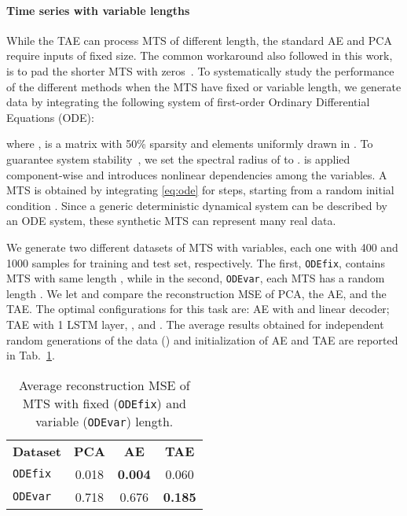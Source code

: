 \documentclass[a4paper,10pt,pdftex]{article}
\begin{document}
\paragraph{\textbf{Time series with variable lengths}}

While the TAE can process MTS of different length, the standard AE and PCA require inputs of fixed size. 
The common workaround also followed in this work, is to pad the shorter MTS with zeros~\cite{mann2008smoothing}.
To systematically study the performance of the different methods when the MTS have fixed or variable length, we generate data by integrating the following system of first-order Ordinary Differential Equations (ODE):

where ,  is a matrix with 50\% sparsity and elements uniformly drawn in .
To guarantee system stability~\cite{bianchi2017multiplex}, we set the spectral radius of  to .
 is applied component-wise and introduces nonlinear dependencies among the variables.
A MTS  is obtained by integrating \eqref{eq:ode} for  steps, starting from a random initial condition .
Since a generic deterministic dynamical system can be described by an ODE system, these synthetic MTS can represent many real data.

We generate two different datasets of MTS with  variables, each one with 400 and 1000 samples for training and test set, respectively.
The first, \texttt{ODEfix}, contains MTS with same length , while in the second, \texttt{ODEvar}, each MTS has a random length .
We let  and compare the reconstruction MSE of PCA, the AE, and the TAE.
The optimal configurations for this task are: AE with  and linear decoder; TAE with 1 LSTM layer, , and .
The average results obtained for  independent random generations of the data () and initialization of AE and TAE are reported in Tab.~\ref{tab:ODE1}.
\begin{table}[!ht]
\footnotesize
\centering
\caption{Average reconstruction MSE of MTS with fixed (\texttt{ODEfix}) and variable (\texttt{ODEvar}) length.}
\label{tab:ODE1}
\begin{tabular}{l|ccc}
\cmidrule[1.5pt]{1-4}
\multirow{1}{*}{\textbf{Dataset}} & \multicolumn{1}{c}{\textbf{PCA}} & \multicolumn{1}{c}{\textbf{AE}} & \multicolumn{1}{c}{\textbf{TAE}} \\
\cmidrule[.5pt]{1-4}
\texttt{ODEfix} & 0.018 & \textbf{0.004} & 0.060 \\
\texttt{ODEvar} & 0.718 & 0.676 & \textbf{0.185} \\
\cmidrule[1.5pt]{1-4}
\end{tabular}
\end{table}
\end{document}
